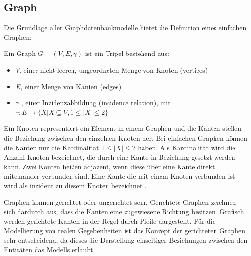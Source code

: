 \subsection{Graph}
Die Grundlage aller Graphdatenbankmodelle bietet die Definition eines einfachen Graphen:
\begin{definition}
	Ein $\text{Graph } G=(V,E,\gamma)$ ist ein Tripel bestehend aus:
	\begin{itemize}
		\item $V$, einer nicht leeren, ungeordneten Menge von Knoten (vertices)
		\item $E$, einer Menge von Kanten (edges)
		\item $\gamma$ , einer Inzidenzabbildung (incidence relation), mit\\
		$\gamma : E \longrightarrow \{X | X \subseteq V, 1 \leq |X| \leq 2\}$
	\end{itemize}\cite{pbeck01}
\end{definition}
Ein Knoten representiert ein Element in einem Graphen und die Kanten stellen die Beziehung zwischen den einzelnen Knoten her.
Bei einfachen Graphen können die Kanten nur die Kardinalität $1 \leq |X| \leq 2$ haben.
Als Kardinalität wird die Anzahl Knoten bezeichnet, die durch eine Kante in Beziehung gesetzt werden kann.
Zwei Konten heißen adjazent, wenn diese über eine Kante direkt miteinander verbunden sind.
Eine Kante die mit einem Knoten verbunden ist wird als inzident zu diesem Knoten bezeichnet \cite{knauer2015diskrete}.

Graphen können gerichtet oder ungerichtet sein.
Gerichtete Graphen zeichnen sich dardurch aus, dass die Kanten eine zugewiesene Richtung besitzen.
Grafisch werden gerichtete Kanten in der Regel durch Pfeile dargestellt.
Für die Modellierung von realen Gegebenheiten ist das Konzept der gerichteten Graphen sehr entscheidend, da dieses die Darstellung einseitiger Beziehungen zwischen den Entitäten das Modells erlaubt.

